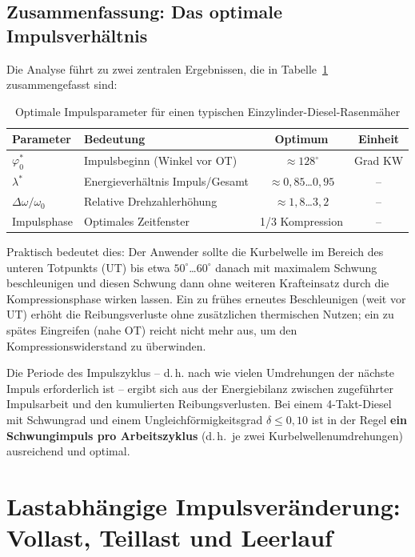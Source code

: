 ﻿\documentclass[a4paper,12pt]{article}
\begin{document}
\subsection{Zusammenfassung: Das optimale Impulsverhältnis}

Die Analyse führt zu zwei zentralen Ergebnissen, die in Tabelle~\ref{tab:optimum}
zusammengefasst sind:

\begin{table}[h]
\centering
\caption{Optimale Impulsparameter für einen typischen Einzylinder-Diesel-Rasenmäher}
\label{tab:optimum}
\begin{tabular}{llcc}
\toprule
\textbf{Parameter} & \textbf{Bedeutung} & \textbf{Optimum} & \textbf{Einheit} \\
\midrule
$\varphi_0^*$ & Impulsbeginn (Winkel vor OT) & $\approx 128^\circ$ & Grad KW \\
$\lambda^*$   & Energieverhältnis Impuls/Gesamt & $\approx 0{,}85$\ldots$0{,}95$ & -- \\
$\Delta\omega/\omega_0$ & Relative Drehzahlerhöhung & $\approx 1{,}8$\ldots$3{,}2$ & -- \\
Impulsphase   & Optimales Zeitfenster & 1/3 Kompression & -- \\
\bottomrule
\end{tabular}
\end{table}

\noindent
Praktisch bedeutet dies: Der Anwender sollte die Kurbelwelle im Bereich des
unteren Totpunkts (UT) bis etwa $50^\circ$\ldots$60^\circ$ danach mit maximalem Schwung
beschleunigen und diesen Schwung dann ohne weiteren Krafteinsatz durch die
Kompressionsphase wirken lassen. Ein zu frühes erneutes Beschleunigen (weit
vor UT) erhöht die Reibungsverluste ohne zusätzlichen thermischen Nutzen;
ein zu spätes Eingreifen (nahe OT) reicht nicht mehr aus, um den Kompressionswiderstand
zu überwinden.

Die Periode des Impulszyklus -- d.\,h. nach wie vielen Umdrehungen der nächste
Impuls erforderlich ist -- ergibt sich aus der Energiebilanz zwischen zugeführter
Impulsarbeit und den kumulierten Reibungsverlusten. Bei einem 4-Takt-Diesel
mit Schwungrad und einem Ungleichförmigkeitsgrad $\delta \leq 0{,}10$ ist in
der Regel \textbf{ein Schwungimpuls pro Arbeitszyklus} (d.\,h.\ je zwei Kurbelwellenumdrehungen)
ausreichend und optimal.

\section{Lastabhängige Impulsveränderung: Vollast, Teillast und Leerlauf}
\label{sec:last}
\end{document}
